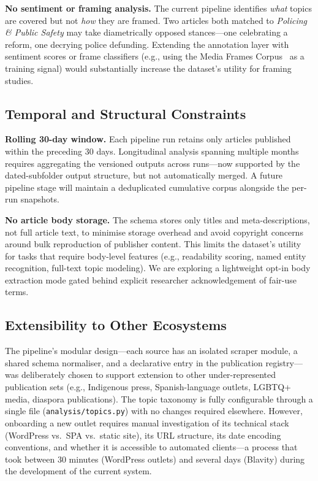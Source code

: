 \documentclass[sigconf,anonymous,review]{acmart}
\begin{document}
\noindent\textbf{No sentiment or framing analysis.}
The current pipeline identifies \emph{what} topics are covered but not
\emph{how} they are framed.
Two articles both matched to \emph{Policing \& Public Safety} may take
diametrically opposed stances—one celebrating a reform, one decrying police
defunding.
Extending the annotation layer with sentiment scores or frame classifiers
(e.g., using the Media Frames Corpus~\cite{card2015media} as a training signal)
would substantially increase the dataset's utility for framing studies.

\subsection{Temporal and Structural Constraints}

\noindent\textbf{Rolling 30-day window.}
Each pipeline run retains only articles published within the preceding 30 days.
Longitudinal analysis spanning multiple months requires aggregating the
versioned outputs across runs—now supported by the dated-subfolder output
structure, but not automatically merged.
A future pipeline stage will maintain a deduplicated cumulative corpus alongside
the per-run snapshots.

\noindent\textbf{No article body storage.}
The schema stores only titles and meta-descriptions, not full article text,
to minimise storage overhead and avoid copyright concerns around bulk
reproduction of publisher content.
This limits the dataset's utility for tasks that require body-level features
(e.g., readability scoring, named entity recognition, full-text topic modeling).
We are exploring a lightweight opt-in body extraction mode gated behind
explicit researcher acknowledgement of fair-use terms.

\subsection{Extensibility to Other Ecosystems}

The pipeline's modular design—each source has an isolated scraper module, a
shared schema normaliser, and a declarative entry in the publication registry—
was deliberately chosen to support extension to other under-represented
publication sets (e.g., Indigenous press, Spanish-language outlets, LGBTQ+
media, diaspora publications).
The topic taxonomy is fully configurable through a single file
(\texttt{analysis/topics.py}) with no changes required elsewhere.
However, onboarding a new outlet requires manual investigation of its technical
stack (WordPress vs.\ SPA vs.\ static site), its URL structure, its date
encoding conventions, and whether it is accessible to automated clients—a
process that took between 30 minutes (WordPress outlets) and several days
(Blavity) during the development of the current system.
\end{document}
